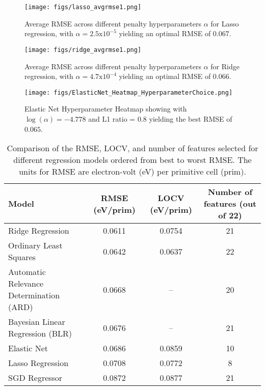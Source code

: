 \documentclass{article}
\begin{document}
\begin{figure}[h!]
    \centering
    \begin{minipage}{0.45\textwidth}
      \centering
      \texttt{[image: figs/lasso\_avgrmse1.png]}
      \caption{Average RMSE across different penalty hyperparameters \( \alpha \) for Lasso regression, with \( \alpha = 2.5 \text{x} 10^{-5} \) yielding an optimal RMSE of \(0.067\).}
      \label{fig:Experiment2-lassoReg}
      \vfill %
      \centering
      \texttt{[image: figs/ridge\_avgrmse1.png]}
      \caption{Average RMSE across different penalty hyperparameters \( \alpha \) for Ridge regression, with \( \alpha = 4.7 \text{x} 10^{-4}  \) yielding an optimal RMSE of \(0.066\).}
      \label{fig:Experiment2-ridgeReg}
    \end{minipage}
    \hfill %
    \begin{minipage}{0.40\textwidth}
        \centering
        \texttt{[image: figs/ElasticNet\_Heatmap\_HyperparameterChoice.png]}
        \caption{Elastic Net Hyperparameter Heatmap showing with \(\log(\alpha) = -4.778\) and L1 ratio = \(0.8\) yielding the best RMSE of \(0.065\).}
        \label{fig:Experiment2-ElasticNetHyperparam}
    \end{minipage}
\end{figure}

\pagebreak

\begin{table}[h!]
\centering
\caption{Comparison of the RMSE, LOCV, and number of features selected for different regression models ordered from best to worst RMSE. The units for RMSE are electron-volt (eV) per primitive cell (prim).}
\begin{tabular}{lccc}
\hline
\textbf{Model} & \textbf{RMSE (eV/prim)} & \textbf{LOCV (eV/prim)} & \textbf{Number of features (out of 22)} \\
\hline
Ridge Regression      & 0.0611 & 0.0754 & 21 \\
Ordinary Least Squares & 0.0642 & 0.0637 & 22 \\
Automatic Relevance Determination (ARD) & 0.0668 & – & 20  \\
Bayesian Linear Regression (BLR) & 0.0676 & – & 21 \\
Elastic Net           & 0.0686 & 0.0859    & 10 \\
Lasso Regression      & 0.0708 & 0.0772 & 8  \\
SGD Regressor         & 0.0872 & 0.0877 & 21 \\
\hline
\end{tabular}

\label{tab:Experiment2-regularization-comparison}
\end{table}
\end{document}
